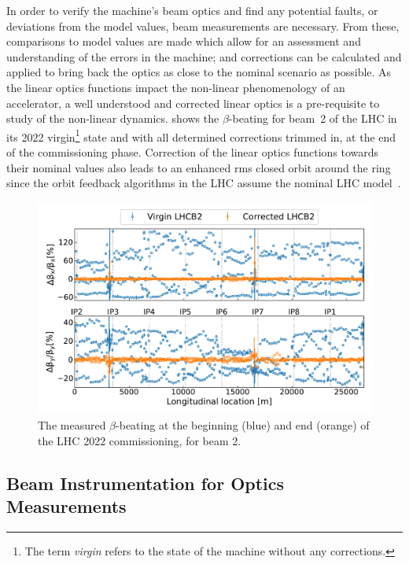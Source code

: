 In order to verify the machine's beam optics and find any potential faults, or deviations from the model values, beam measurements are necessary.
From these, comparisons to model values are made which allow for an assessment and understanding of the errors in the machine; and corrections can be calculated and applied to bring back the optics as close to the nominal scenario as possible.
As the linear optics functions impact the non-linear phenomenology of an accelerator, a well understood and corrected linear optics is a pre-requisite to study of the non-linear dynamics.
 shows the \(\beta\)-beating for beam~\num{2} of the LHC in its \num{2022} virgin\footnote{The term \textit{virgin} refers to the state of the machine without any corrections.} state and with all determined corrections trimmed in, at the end of the commissioning phase.
Correction of the linear optics functions towards their nominal values also leads to an enhanced rms closed orbit around the ring since the orbit feedback algorithms in the LHC assume the nominal LHC model~\cite{PRAB:Tomas:Record_Low_Beta_Beating_in_the_LHC, PRAB:Persson:LHC_Optics_Commissioning_OnePercent}.

\begin{figure}[!hbt]
  \centering
  \includegraphics*[width=0.9\linewidth]{Figures/Optics_Measurements_Corrections_at_LHC/virgin_vs_commissionned_lhcb2.pdf}
  \caption{The measured \(\beta\)-beating at the beginning (\textcolor{mplblue}{blue}) and end (\textcolor{mplorange}{orange}) of the LHC \num{2022} commissioning, for beam \num{2}.}
  \label{figure:virgin_vs_corrected_lhcb2}
\end{figure}

\subsection{Beam Instrumentation for Optics Measurements}
\label{subsection:beam_instrumentation_for_optics_measurements}

